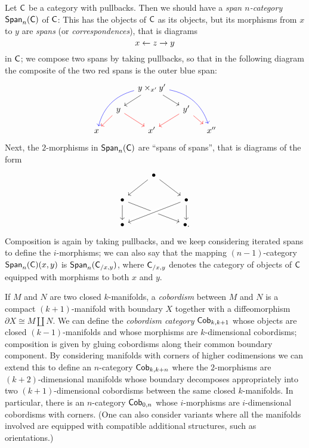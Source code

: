 \documentclass[a4paper,11pt]{article}
\begin{document}
\begin{ex}\label{ex:span}
  Let $\textup{\textsf{C}}$ be a category with pullbacks. Then we should have a
  \emph{span $n$-category} $\textup{\textsf{Span}}_{n}(\textup{\textsf{C}})$ of $\textup{\textsf{C}}$: This has the
  objects of $\textup{\textsf{C}}$ as its objects, but its morphisms from $x$ to $y$
  are \emph{spans} (or \emph{correspondences}), that is diagrams
  \[ x \from z \to y \]
  in $\textup{\textsf{C}}$; we compose two spans by taking pullbacks, so that in the
  following diagram the
  composite of the two red spans is the outer blue span:
  \[
    \begin{tikzcd}[column sep=small, row sep=small]
        &   & y \times_{x'} y' \ar[dl] \ar[dr] \ar[ddll, color=blue,
        bend right] \ar[ddrr, color=blue, bend left] \\
        & y \ar[dl,color=red] \ar[dr,color=red] & & y'
        \ar[dl,color=red] \ar[dr,color=red] \\
      x & & x' & & x''
    \end{tikzcd}
  \]
  Next, the $2$-morphisms in $\textup{\textsf{Span}}_{n}(\textup{\textsf{C}})$ are ``spans of spans'',
  that is diagrams of the form
  \[
    \begin{tikzcd}
       & \bullet \ar[dl] \ar[dr] \\
      \bullet \ar[d] \ar[drr] & & \bullet \ar[d]  \ar[dll, crossing over] \\
      \bullet & & \bullet.
    \end{tikzcd}
  \]
  Composition is again by taking pullbacks, and we keep considering
  iterated spans to define the $i$-morphisms; we can also say that the
  mapping $(n-1)$-category $\textup{\textsf{Span}}_{n}(\textup{\textsf{C}})(x,y)$ is
  $\textup{\textsf{Span}}_{n}(\textup{\textsf{C}}_{/x,y})$, where $\textup{\textsf{C}}_{/x,y}$ denotes the category of
  objects of $\textup{\textsf{C}}$ equipped with morphisms to both $x$ and $y$.
\end{ex}

\begin{ex}\label{ex:cob}
  If $M$ and $N$ are two closed $k$-manifolds, a \emph{cobordism}
  between $M$ and $N$ is a compact $(k+1)$-manifold with boundary $X$
  together with a diffeomorphism $\partial X \cong M \amalg N$. We can
  define the \emph{cobordism category} $\textup{\textsf{Cob}}_{k,k+1}$ whose
  objects are closed $(k-1)$-manifolds and whose morphisms are
  $k$-dimensional cobordisms; composition is given by gluing
  cobordisms along their common boundary component. By considering
  manifolds with corners of higher codimensions we can extend this to
  define an $n$-category $\textup{\textsf{Cob}}_{k,k+n}$ where the $2$-morphisms
  are $(k+2)$-dimensional manifolds whose boundary decomposes
  appropriately into two $(k+1)$-dimensional cobordisms between the
  same closed $k$-manifolds. In particular, there is an $n$-category
  $\textup{\textsf{Cob}}_{0,n}$ whose $i$-morphisms are
  $i$-dimensional cobordisms with corners. (One can also consider
  variants where all the manifolds involved are equipped with
  compatible additional structures, such as orientations.)
\end{ex}
\end{document}
